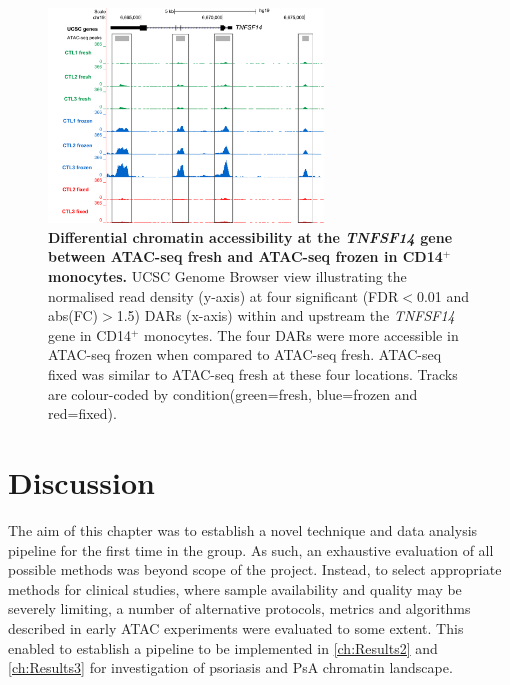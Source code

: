	
\begin{figure}[htbp]
\centering
\includegraphics[width=0.65\textwidth]{./Results1/pdfs/Core_CD14_TNFSF14_track_UCSC}
\caption[Differential chromatin accessibility at the \textit{TNFSF14} gene between ATAC-seq fresh and ATAC-seq frozen in CD14$^+$ monocytes.]{\textbf{Differential chromatin accessibility at the \textit{TNFSF14} gene between ATAC-seq fresh and ATAC-seq frozen in CD14$^+$ monocytes.} UCSC Genome Browser view illustrating the normalised read density (y-axis) at four significant (FDR$<$0.01 and abs(FC)$>$1.5) DARs (x-axis) within and upstream the \textit{TNFSF14} gene in CD14$^+$ monocytes. The four DARs were more accessible in ATAC-seq frozen when compared to ATAC-seq fresh. ATAC-seq fixed was similar to ATAC-seq fresh at these four locations. Tracks are colour-coded by condition(green=fresh, blue=frozen and red=fixed).}
\label{figure:Core_CD14_differential_TNFSF14}
\end{figure} 	



\section{Discussion}

The aim of this chapter was to establish a novel technique and data analysis pipeline for the first time in the group. As such, an exhaustive evaluation of all possible methods was beyond scope of the project. Instead, to select appropriate methods for clinical studies, where sample availability and quality may be severely limiting, a number of alternative protocols, metrics and algorithms described in early ATAC experiments were evaluated to some extent. This enabled to establish a pipeline to be implemented in \ref{ch:Results2} and \ref{ch:Results3} for investigation of psoriasis and PsA chromatin landscape.

